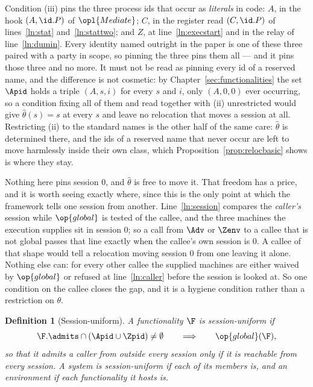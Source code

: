 \documentclass[10pt,oneside,openany]{book}
\theoremstyle{accentdef}
\newtheorem{definition}{Definition}[chapter]
\theoremstyle{accentplain}
\begin{document}
Condition (iii) pins the three process ids
that occur as \emph{literals} in code: $A$, in the hook $(A,\id.P)$ of $\opl{Mediate}$; $C$, in the
register read $(C,\id.P)$ of lines~\ref{ln:stat} and~\ref{ln:stattwo}; and $Z$, at
line~\ref{ln:execstart} and in the relay of line~\ref{ln:dumin}. Every identity named outright in the
paper is one of these three paired with a party in scope, so pinning the three pins them all --- and
it pins those three and no more. It must not be read as pinning every id of a reserved name, and the difference is
not cosmetic: by Chapter~\ref{sec:functionalities} the set $\Apid$ holds a triple $(A,s,i)$ for
every $s$ and $i$, only $(A,0,0)$ ever occurring, so a condition fixing all of them and read
together with (ii) unrestricted would give $\hat\theta(s) = s$ at every $s$ and leave no relocation
that moves a session at all. Restricting (ii) to the standard names is the other half of the same
care: $\hat\theta$ is determined there, and the ids of a reserved name that never occur are left to move
harmlessly inside their own class, which Proposition~\ref{prop:relocbasic} shows is where they stay.

Nothing here pins session $0$, and $\hat\theta$ is free to move it. That freedom has a price, and it
is worth seeing exactly where, since this is the only point at which the framework tells one session
from another. Line~\ref{ln:session} compares the \emph{caller's} session while $\op{global}$ is tested
of the callee, and the three machines the execution supplies sit in session $0$; so a call from
$\Adv$ or $\Zenv$ to a callee that is not global passes that line exactly when the callee's own
session is $0$. A callee of that shape would tell a relocation moving session $0$ from one leaving it
alone. Nothing else can: for every other callee the supplied machines are either waived by
$\op{global}$ or refused at line~\ref{ln:caller} before the session is looked at. So one condition on
the callee closes the gap, and it is a hygiene condition rather than a restriction on $\theta$.

\begin{definition}[Session-uniform]\label{def:sessunif}
A functionality $\F$ is \emph{session-uniform} if
\[
  \F.\admits \cap (\Apid \cup \Zpid) \neq \emptyset
  \qquad\Longrightarrow\qquad
  \op{global}(\F) ,
\]
so that it admits a caller from outside every session only if it is reachable from every session. A
system is session-uniform if each of its members is, and an environment if each functionality it
hosts is.
\end{definition}
\end{document}

